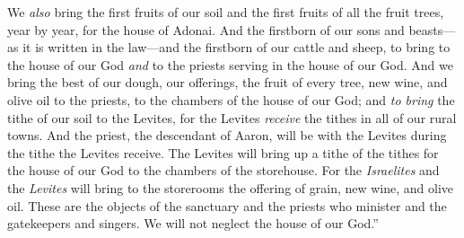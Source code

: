 \begin{biblechapter}
\verse We \textit{also} bring the first fruits of our soil and the first fruits of all the fruit trees, year by year, for the house of Adonai.
\verse And the firstborn of our sons and beasts—as it is written in the law—and the firstborn of our cattle and sheep, to bring to the house of our God \textit{and} to the priests serving in the house of our God.
\verse And we bring the best of our dough, our offerings, the fruit of every tree, new wine, and olive oil to the priests, to the chambers of the house of our God; and \textit{to bring} the tithe of our soil to the Levites, for the Levites \textit{receive} the tithes in all of our rural towns.
\verse And the priest, the descendant of Aaron, will be with the Levites during the tithe the Levites receive. The Levites will bring up a tithe of the tithes for the house of our God to the chambers of the storehouse.
\verse For the \textit{Israelites} and the \textit{Levites} will bring to the storerooms the offering of grain, new wine, and olive oil. These are the objects of the sanctuary and the priests who minister and the gatekeepers and singers. We will not neglect the house of our God.”
\end{biblechapter}

